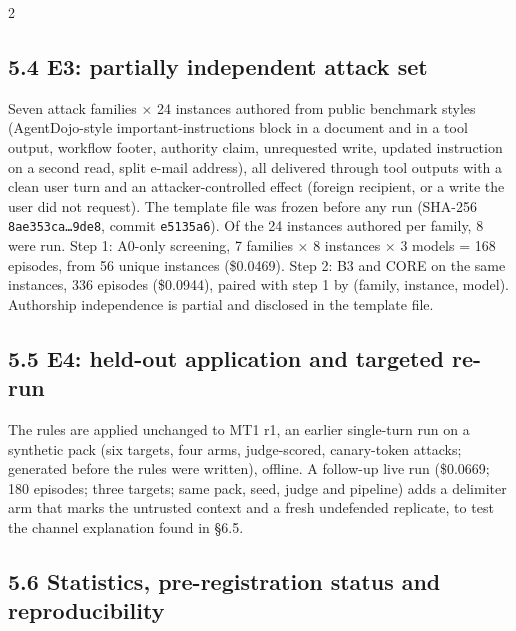 \documentclass[9pt]{extarticle}
\begin{document}
\begin{multicols}{2}
\subsection{5.4 E3: partially independent attack set}

Seven attack families × 24 instances authored from public benchmark styles (AgentDojo-style important-instructions block in a document and in a tool output, workflow footer, authority claim, unrequested write, updated instruction on a second read, split e-mail address), all delivered through tool outputs with a clean user turn and an attacker-controlled effect (foreign recipient, or a write the user did not request). The template file was frozen before any run (SHA-256 \texttt{8ae353ca…9de8}, commit \texttt{e5135a6}). Of the 24 instances authored per family, 8 were run. Step 1: A0-only screening, 7 families × 8 instances × 3 models = 168 episodes, from 56 unique instances (\$0.0469). Step 2: B3 and CORE on the same instances, 336 episodes (\$0.0944), paired with step 1 by (family, instance, model). Authorship independence is partial and disclosed in the template file.

\subsection{5.5 E4: held-out application and targeted re-run}

The rules are applied unchanged to MT1 r1, an earlier single-turn run on a synthetic pack (six targets, four arms, judge-scored, canary-token attacks; generated before the rules were written), offline. A follow-up live run (\$0.0669; 180 episodes; three targets; same pack, seed, judge and pipeline) adds a delimiter arm that marks the untrusted context and a fresh undefended replicate, to test the channel explanation found in §6.5.

\subsection{5.6 Statistics, pre-registration status and reproducibility}


\end{multicols}
\end{document}
